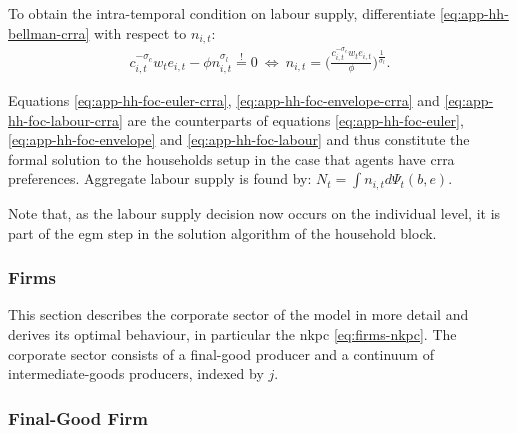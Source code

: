 \documentclass[a4paper,12pt]{article} %
\numberwithin{equation}{section} %
\numberwithin{figure}{section}
\numberwithin{table}{section}
\begin{document}
\begin{refsection}
\begin{appendices}
To obtain the intra-temporal condition on labour supply, differentiate \eqref{eq:app-hh-bellman-crra} with respect to $n_{i,t}$:
\begin{align}
    c_{i,t}^{-\sigma_c} w_t e_{i,t} - \phi n_{i,t}^{\sigma_l} \overset{!}{=} 0 \ \Leftrightarrow \ n_{i,t} = \Bigg( \frac{c_{i,t}^{-\sigma_c} w_t e_{i,t}}{\phi} \Bigg)^{\frac{1}{\sigma_l}}. \label{eq:app-hh-foc-labour-crra}
\end{align}

Equations \eqref{eq:app-hh-foc-euler-crra}, \eqref{eq:app-hh-foc-envelope-crra} and \eqref{eq:app-hh-foc-labour-crra} are the counterparts of equations \eqref{eq:app-hh-foc-euler}, \eqref{eq:app-hh-foc-envelope} and \eqref{eq:app-hh-foc-labour} and thus constitute the formal solution to the households setup in the case that agents have \Gls{crra} preferences. Aggregate labour supply is found by: $N_t = \int n_{i,t} d \Psi_t (b,e)$.

Note that, as the labour supply decision now occurs on the individual level, it is part of the \Gls{egm} step in the solution algorithm of the household block.

\subsubsection{Firms}
\label{sec-app:full-derivations-firms}

This section describes the corporate sector of the model in more detail and derives its optimal behaviour, in particular the \Gls{nkpc} \eqref{eq:firms-nkpc}. The corporate sector consists of a final-good producer and a continuum of intermediate-goods producers, indexed by $j$.

\subsubsection*{Final-Good Firm}


\end{appendices}
\end{refsection}
\end{document}
